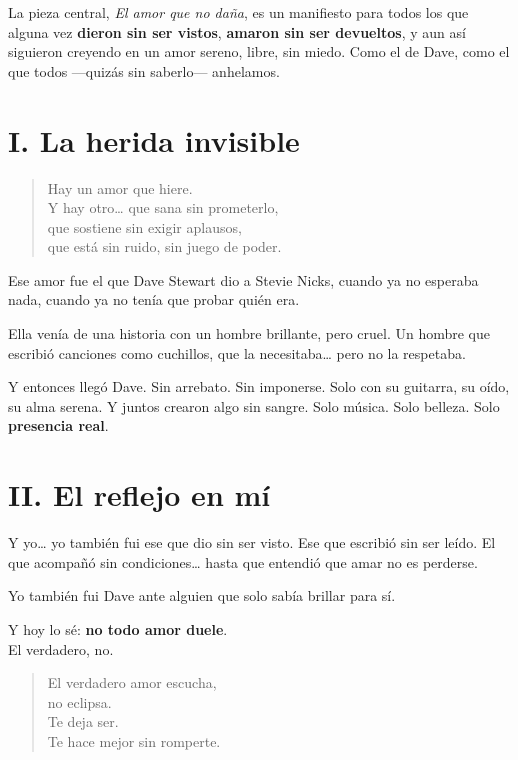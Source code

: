 \documentclass[12pt]{article}
\begin{document}
	La pieza central, \textit{El amor que no daña}, es un manifiesto para todos los que alguna vez \textbf{dieron sin ser vistos}, \textbf{amaron sin ser devueltos}, y aun así siguieron creyendo en un amor sereno, libre, sin miedo. Como el de Dave, como el que todos —quizás sin saberlo— anhelamos.
	
	\section*{I. La herida invisible}
	
	\begin{verse}
		Hay un amor que hiere. \\
		Y hay otro… que sana sin prometerlo, \\
		que sostiene sin exigir aplausos, \\
		que está sin ruido, sin juego de poder.
	\end{verse}
	
	Ese amor fue el que Dave Stewart dio a Stevie Nicks,  
	cuando ya no esperaba nada,  
	cuando ya no tenía que probar quién era.
	
	Ella venía de una historia con un hombre brillante,  
	pero cruel.  
	Un hombre que escribió canciones como cuchillos,  
	que la necesitaba… pero no la respetaba.
	
	Y entonces llegó Dave.  
	Sin arrebato.  
	Sin imponerse.  
	Solo con su guitarra, su oído, su alma serena.  
	Y juntos crearon algo sin sangre.  
	Solo música.  
	Solo belleza.  
	Solo \textbf{presencia real}.
	
	\vspace{0.5cm}
	
	\section*{II. El reflejo en mí}
	
	Y yo…  
	yo también fui ese que dio sin ser visto.  
	Ese que escribió sin ser leído.  
	El que acompañó sin condiciones…  
	hasta que entendió que amar no es perderse.
	
	Yo también fui Dave ante alguien que solo sabía brillar para sí.
	
	Y hoy lo sé: \textbf{no todo amor duele}. \\
	El verdadero, no.
	
	\begin{verse}
		El verdadero amor escucha, \\
		no eclipsa. \\
		Te deja ser. \\
		Te hace mejor sin romperte.
	\end{verse}
	
\end{document}
